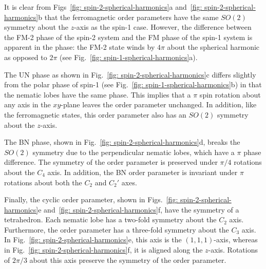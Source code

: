 It is clear from Figs~\ref{fig: spin-2-spherical-harmonics}a
and~\ref{fig: spin-2-spherical-harmonics}b that the ferromagnetic order
parameters have the same \(SO(2)\) symmetry about the \(z\)-axis as the spin-1
case.
However, the difference between the FM-2 phase of the spin-2 system and the FM
phase of the spin-1 system is apparent in the phase: the FM-2 state winds by
\(4\pi \) about the spherical harmonic as opposed to \(2\pi \)
(see Fig.~\ref{fig: spin-1-spherical-harmonics}a).

The UN phase as shown in Fig.~\ref{fig: spin-2-spherical-harmonics}c differs
slightly from the polar phase of spin-1 (see
Fig.~\ref{fig: spin-1-spherical-harmonics}b) in that the nematic lobes have the
same phase.
This implies that a \(\pi \) spin rotation about any axis in the \(xy\)-plane
leaves the order parameter unchanged.
In addition, like the ferromagnetic states, this order parameter also has an
\(SO(2)\) symmetry about the \(z\)-axis.

The BN phase, shown in Fig.~\ref{fig: spin-2-spherical-harmonics}d, breaks the
\(SO(2)\) symmetry due to the perpendicular nematic lobes, which have a \(\pi \)
phase difference.
The symmetry of the order parameter is preserved under \(\pi/4\) rotations
about the \(C_4\) axis.
In addition, the BN order parameter is invariant under \(\pi \) rotations about
both the \(C_2\) and \(C_2'\) axes.

Finally, the cyclic order parameter, shown in
Figs.~\ref{fig: spin-2-spherical-harmonics}e
and~\ref{fig: spin-2-spherical-harmonics}f, have the symmetry of a tetrahedron.
Each nematic lobe has a two-fold symmetry about the \(C_2\) axis.
Furthermore, the order parameter has a three-fold symmetry about the \(C_3\)
axis.
In Fig.~\ref{fig: spin-2-spherical-harmonics}e, this axis is the
\((1, 1, 1)\)-axis, whereas in Fig.~\ref{fig: spin-2-spherical-harmonics}f,
it is aligned along the \(z\)-axis.
Rotations of \(2\pi/3\) about this axis preserve the symmetry of the order
parameter.


